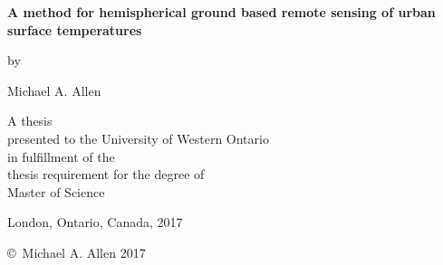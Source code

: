 \pagestyle{empty}

\begin{titlepage}
        \begin{center}
        \vspace*{1.0cm}

        \Huge
        {\bf A method for hemispherical ground based remote sensing of urban surface temperatures}

        \vspace*{1.0cm}

        \normalsize
        by \\

        \vspace*{1.0cm}

        \Large
        Michael A. Allen \\
        
        \vspace*{3.0cm}

        \normalsize
        A thesis \\
        presented to the University of Western Ontario\\ 
        in fulfillment of the \\
        thesis requirement for the degree of \\
        Master of Science \\

        \vspace*{2.0cm}

        London, Ontario, Canada, 2017 \\

        \vspace*{1.0cm}

        \copyright\ Michael A. Allen 2017 \\
        \end{center}
\end{titlepage}

